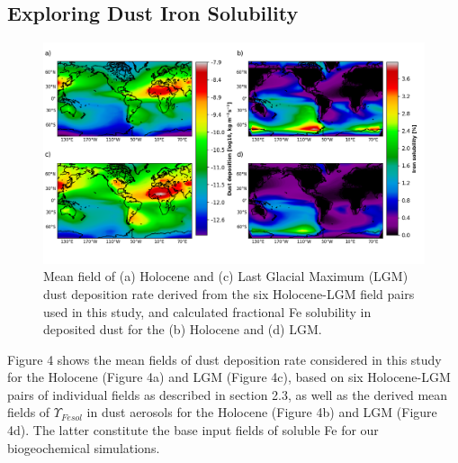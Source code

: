 
\subsection{Exploring Dust Iron Solubility}

\begin{figure}[h!]
    \includegraphics[scale=0.65]{../../Data_function/Function/PicturePaper/Figure7.png}
    \caption{Mean field of (a) Holocene and (c) Last Glacial Maximum (LGM) dust deposition rate derived from the six Holocene-LGM field pairs used in this study, and calculated fractional Fe solubility in deposited dust for the (b) Holocene and (d) LGM.}
\end{figure}


Figure 4 shows the mean fields of dust deposition rate considered in this study for the Holocene (Figure 4a) and LGM (Figure 4c), based on six Holocene-LGM pairs of individual fields as described in section 2.3, as well as the derived mean fields of $\Upsilon_{Fesol}$ in dust aerosols for the Holocene (Figure 4b) and LGM (Figure 4d). The latter constitute the base input fields of soluble Fe for our biogeochemical simulations. 

